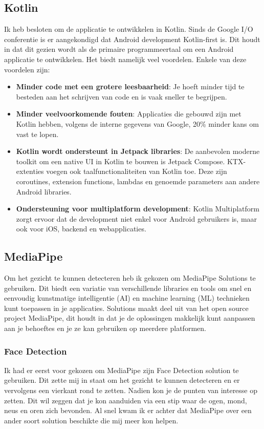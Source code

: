 \subsection{Kotlin}
Ik heb besloten om de applicatie te ontwikkelen in Kotlin. Sinds de Google I/O conferentie is er aangekondigd dat Android development Kotlin-first is. Dit houdt in dat dit gezien wordt als de primaire programmeertaal om een Android applicatie te ontwikkelen. Het biedt namelijk veel voordelen. Enkele van deze voordelen zijn:
\begin{itemize}
    \item \textbf{Minder code met een grotere leesbaarheid}: Je hoeft minder tijd te besteden aan het schrijven van code en is vaak sneller te begrijpen.
    \item \textbf{Minder veelvoorkomende fouten}: Applicaties die gebouwd zijn met Kotlin hebben, volgens de interne gegevens van Google, 20\% minder kans om vast te lopen.
    \item \textbf{Kotlin wordt ondersteunt in Jetpack libraries}: De aanbevolen moderne toolkit om een native UI in Kotlin te bouwen is Jetpack Compose. KTX-extenties voegen ook taalfunctionaliteiten van Kotlin toe. Deze zijn coroutines, extension functions, lambdas en genoemde parameters aan andere Android libraries.
    \item \textbf{Ondersteuning voor multiplatform development}: Kotlin Multiplatform zorgt ervoor dat de development niet enkel voor Android gebruikers is, maar ook voor iOS, backend en webapplicaties.
\end{itemize}

\subsection{MediaPipe}
Om het gezicht te kunnen detecteren heb ik gekozen om MediaPipe Solutions te gebruiken. Dit biedt een variatie van verschillende libraries en tools om snel en eenvoudig kunstmatige intelligentie (AI) en machine learning (ML) technieken kunt toepassen in je applicaties. Solutions maakt deel uit van het open source project MediaPipe, dit houdt in dat je de oplossingen makkelijk kunt aanpassen aan je behoeftes en je ze kan gebruiken op meerdere platformen.
\subsubsection{Face Detection}
Ik had er eerst voor gekozen om MediaPipe zijn Face Detection solution te gebruiken. Dit zette mij in staat om het gezicht te kunnen detecteren en er vervolgens een vierkant rond te zetten. Nadien kon je de punten van interesse op zetten. Dit wil zeggen dat je kon aanduiden via een stip waar de ogen, mond, neus en oren zich bevonden. Al snel kwam ik er achter dat MediaPipe over een ander soort solution beschikte die mij meer kon helpen.
